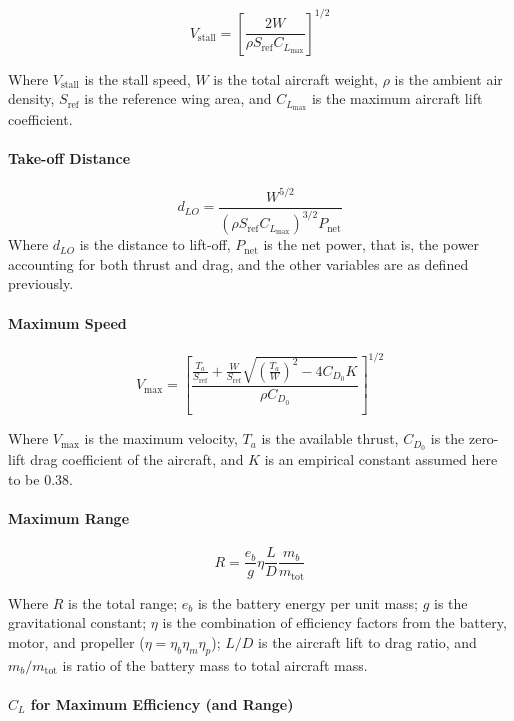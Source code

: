 \documentclass[report]{byu-aero}
\begin{document}
\[V_\text{stall} = \left[ \frac{2W}{\rho S_\text{ref} C_{L_\text{max}}} \right]^{1/2}\]

Where \(V_\text{stall}\) is the stall speed, \(W\) is the total aircraft weight, \(\rho\) is the ambient air density, \(S_\text{ref}\) is the reference wing area, and \(C_{L_\text{max}}\) is the maximum aircraft lift coefficient.

\paragraph{Take-off Distance}

\[ d_{LO} = \frac{ W^{5/2} }{ \left( \rho S_\text{ref} C_{L_\text{max}} \right)^{3/2} P_\text{net} } \]
Where \(d_{LO}\) is the distance to lift-off, \(P_\text{net}\) is the net power, that is, the power accounting for both thrust and drag, and the other variables are as defined previously.

\paragraph{Maximum Speed}

\[ V_\text{max} = \left[ \frac{ \frac{T_a}{S_\text{ref}} + \frac{W}{S_\text{ref}}\sqrt{\left(\frac{T_a}{W}\right)^2 - 4C_{D_0}K } }{\rho C_{D_0}} \right]^{1/2} \]

Where \(V_\text{max}\) is the maximum velocity, \(T_a\) is the available thrust, \(C_{D_0}\) is the zero-lift drag coefficient of the aircraft, and \(K\) is an empirical constant assumed here to be 0.38.

\paragraph{Maximum Range}

\[R = \frac{e_b}{g} \eta \frac{L}{D} \frac{m_b}{m_\text{tot}}\]

Where \(R\) is the total range; \(e_b\) is the battery energy per unit mass; \(g\) is the gravitational constant; \(\eta\) is the combination of efficiency factors from the battery, motor, and propeller (\(\eta=\eta_b\eta_m\eta_p\)); \(L/D\) is the aircraft lift to drag ratio, and \(m_b/m_\text{tot}\) is ratio of the battery mass to total aircraft mass.

\paragraph{\(C_L\) for Maximum Efficiency (and Range)}
\end{document}
